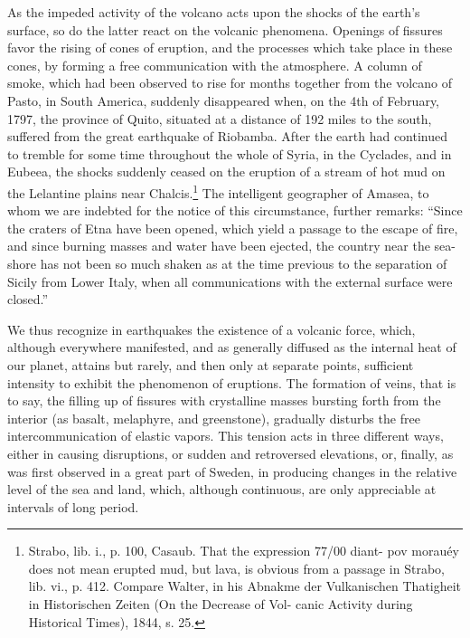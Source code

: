 As the impeded activity of the volcano acts upon the shocks of the earth's surface, so do the latter react on the volcanic phenomena. Openings of fissures favor the rising of cones of eruption, and the processes which take place in these cones, by forming a free communication with the atmosphere. A column of smoke, which had been observed to rise for months together from the volcano of Pasto, in South America, suddenly disappeared when, on the 4th of February, 1797, the province of Quito, situated at a distance of 192 miles to the south, suffered from the great earthquake of Riobamba. After the earth had continued to tremble for some time throughout the whole of Syria, in the Cyclades, and in Eubeea, the shocks suddenly ceased on the eruption of a stream of hot mud on the Lelantine plains near Chalcis.\footnote{Strabo, lib. i., p. 100, Casaub. That the expression 77/00 diant-
pov morauéy does not mean erupted mud, but lava, is obvious from a
passage in Strabo, lib. vi., p. 412. Compare Walter, in his Abnakme der
Vulkanischen Thatigheit in Historischen Zeiten (On the Decrease of Vol-
canic Activity during Historical Times), 1844, s. 25.} The intelligent geographer of Amasea, to whom we are indebted for the notice of this circumstance, further remarks: ``Since the craters of Etna have been opened, which yield a passage to the escape of fire, and since burning masses and water have been ejected, the country near the sea-shore has not been so much shaken as at the time previous to the separation of Sicily from Lower Italy, when all communications with the external surface were closed.''

We thus recognize in earthquakes the existence of a volcanic force, which, although everywhere manifested, and as generally diffused as the internal heat of our planet, attains but rarely, and then only at separate points, sufficient intensity to exhibit the phenomenon of eruptions. The formation of veins, that is to say, the filling up of fissures with crystalline masses bursting forth from the interior (as basalt, melaphyre, and greenstone), gradually disturbs the free intercommunication of elastic vapors. This tension acts in three different ways, either in causing disruptions, or sudden and retroversed elevations, or, finally, as was first observed in a great part of Sweden, in producing changes in the relative level of the sea and land, which, although continuous, are only appreciable at intervals of long period.

